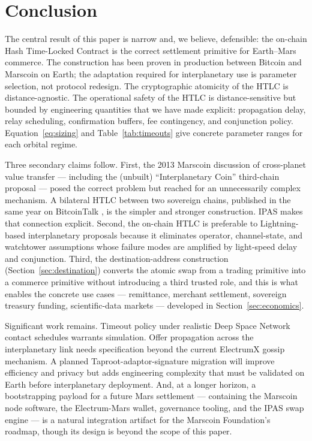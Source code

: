 \documentclass[11pt]{article}
\begin{document}
\section{Conclusion}
\label{sec:conclusion}

The central result of this paper is narrow and, we believe, defensible: the on-chain Hash Time-Locked Contract is the correct settlement primitive for Earth--Mars commerce. The construction has been proven in production between Bitcoin and Marscoin on Earth; the adaptation required for interplanetary use is parameter selection, not protocol redesign. The cryptographic atomicity of the HTLC is distance-agnostic. The operational safety of the HTLC is distance-sensitive but bounded by engineering quantities that we have made explicit: propagation delay, relay scheduling, confirmation buffers, fee contingency, and conjunction policy. Equation~\ref{eq:sizing} and Table~\ref{tab:timeouts} give concrete parameter ranges for each orbital regime.

Three secondary claims follow. First, the 2013 Marscoin discussion of cross-planet value transfer --- including the (unbuilt) ``Interplanetary Coin'' third-chain proposal --- posed the correct problem but reached for an unnecessarily complex mechanism. A bilateral HTLC between two sovereign chains, published in the same year on BitcoinTalk \citep{nolan2013}, is the simpler and stronger construction. IPAS makes that connection explicit. Second, the on-chain HTLC is preferable to Lightning-based interplanetary proposals \citep{puente2025} because it eliminates operator, channel-state, and watchtower assumptions whose failure modes are amplified by light-speed delay and conjunction. Third, the destination-address construction (Section~\ref{sec:destination}) converts the atomic swap from a trading primitive into a commerce primitive without introducing a third trusted role, and this is what enables the concrete use cases --- remittance, merchant settlement, sovereign treasury funding, scientific-data markets --- developed in Section~\ref{sec:economics}.

Significant work remains. Timeout policy under realistic Deep Space Network contact schedules warrants simulation. Offer propagation across the interplanetary link needs specification beyond the current ElectrumX gossip mechanism. A planned Taproot-adaptor-signature migration \citep{marscoin2026electrum} will improve efficiency and privacy but adds engineering complexity that must be validated on Earth before interplanetary deployment. And, at a longer horizon, a bootstrapping payload for a future Mars settlement --- containing the Marscoin node software, the Electrum-Mars wallet, governance tooling, and the IPAS swap engine --- is a natural integration artifact for the Marscoin Foundation's roadmap, though its design is beyond the scope of this paper.
\end{document}
